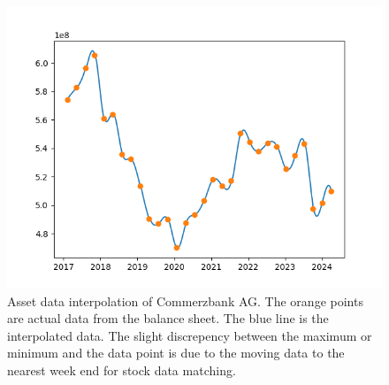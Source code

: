 \documentclass[12pt]{article}
\begin{document}
\begin{figure}[!htbp]
	\centering
	\includegraphics[scale = 0.8]{img/interpolation.png}
	\caption{Asset data interpolation of Commerzbank AG. The orange points are actual data from the balance sheet. The blue line is the interpolated data. The slight discrepency between the maximum or minimum and the data point is due to the moving data to the nearest week end for stock data matching.}
	\label{figure:interpolation_nii}
\end{figure}
\end{document}
